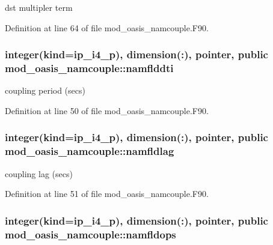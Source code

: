 dst multipler term 



Definition at line 64 of file mod\+\_\+oasis\+\_\+namcouple.\+F90.

\hypertarget{classmod__oasis__namcouple_a9080617143dacb027f74c4c5158b5e58}{
\subsubsection[{namflddti}]{\setlength{\rightskip}{0pt plus 5cm}integer(kind=ip\+\_\+i4\+\_\+p), dimension(\+:), pointer, public mod\+\_\+oasis\+\_\+namcouple\+::namflddti}}\label{classmod__oasis__namcouple_a9080617143dacb027f74c4c5158b5e58}


coupling period (secs) 



Definition at line 50 of file mod\+\_\+oasis\+\_\+namcouple.\+F90.

\hypertarget{classmod__oasis__namcouple_a6a4406ca14f91ef6514a18eb154e648f}{
\subsubsection[{namfldlag}]{\setlength{\rightskip}{0pt plus 5cm}integer(kind=ip\+\_\+i4\+\_\+p), dimension(\+:), pointer, public mod\+\_\+oasis\+\_\+namcouple\+::namfldlag}}\label{classmod__oasis__namcouple_a6a4406ca14f91ef6514a18eb154e648f}


coupling lag (secs) 



Definition at line 51 of file mod\+\_\+oasis\+\_\+namcouple.\+F90.

\hypertarget{classmod__oasis__namcouple_a4841e350d91926f5f8403e73442c76ad}{
\subsubsection[{namfldops}]{\setlength{\rightskip}{0pt plus 5cm}integer(kind=ip\+\_\+i4\+\_\+p), dimension(\+:), pointer, public mod\+\_\+oasis\+\_\+namcouple\+::namfldops}}\label{classmod__oasis__namcouple_a4841e350d91926f5f8403e73442c76ad}


